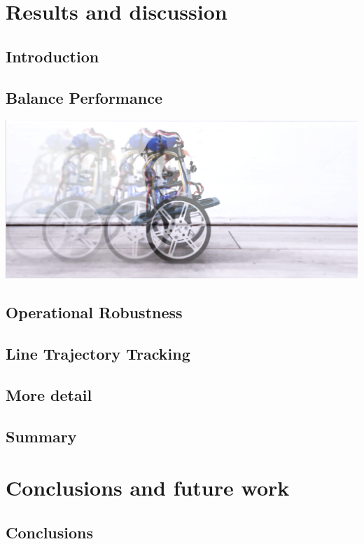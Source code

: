   \section{Results and discussion} %
    \subsection{Introduction}
    \subsection{Balance Performance}
    \includegraphics[width=\textwidth]{V1Colated.png}
    \subsection{Operational Robustness}
    \subsection{Line Trajectory Tracking}
    \subsection{More detail}
    \subsection{Summary}
  \section{Conclusions and future work} %
    \subsection{Conclusions}
